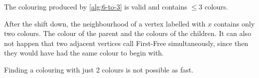 \begin{lem} The colouring produced by \ref{alg:6-to-3} is valid and contains $\leq 3$ colours.\end{lem}

\begin{pr} After the shift down, the neighbourhood of a vertex labelled with $x$ contains only two colours. The colour of the parent and the colours of the children. It can also not happen that two adjacent vertices call First-Free simultaneously, since then they would have had the same colour to begin with.\end{pr}

Finding a colouring with just 2 colours is not possible as fast.